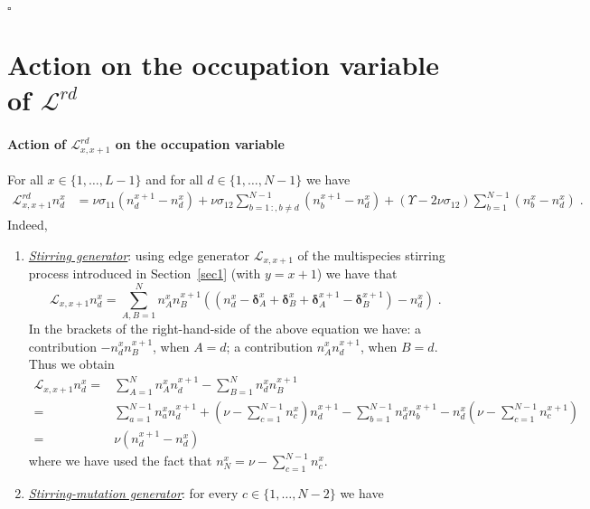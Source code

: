 \documentclass[10pt]{article}
\numberwithin{equation}{section}
\numberwithin{equation}{subsection}
\newcommand{\dt}{\;.}
\begin{document}
{\begin{flushright}
	$\square$
\end{flushright}
\section{Action on the occupation variable of $\mathcal{L}^{rd}$}\label{appendix-RD}
\paragraph{Action of $\mathcal{L}_{x,x+1}^{rd}$ on the occupation variable}
For all $x\in \{1,\ldots,L-1\}$ and for all $d\in \{1,\ldots,N-1\}$ we have
\begin{equation}\label{actionGraphRD}
	\begin{split}
		\mathcal{L}_{x,x+1}^{rd}n_{d}^{x}&=\nu \sigma_{11}(n_{d}^{x+1}-n_{d}^{x})+\nu\sigma_{12}\sum_{b=1\,:	,b\neq d}^{N-1}(n_{b}^{x+1}-n_{d}^{x})+(\Upsilon-2\nu\sigma_{12})\sum_{b=1}^{N-1}(n_{b}^{x}-n_{d}^{x})\dt
	\end{split}
\end{equation}
Indeed, 
\begin{enumerate}
	\item \textit{\underline{Stirring generator}}: {using edge generator $\mathcal{L}_{x,x+1}$ of the multispecies stirring process introduced in Section~\ref{sec1} (with $y=x+1$) we have that} 
\begin{equation}
	\mathcal{L}_{x,x+1}n_{d}^{x}=\sum_{A,B=1}^{N}n_{A}^{x}n_{B}^{x+1}\left((n_{d}^{x}-\bm{\delta}_{A}^{x}+\bm{\delta}_{B}^{x}+\bm{\delta}_{A}^{x+1}-\bm{\delta}_{B}^{x+1})-n_{d}^{x}\right)\dt
\end{equation}
In the brackets of the right-hand-side of the above equation we have: a contribution $-n_{d}^{x}n_{B}^{x+1}$, when $A=d$; a contribution $n_{A}^{x}n_{d}^{x+1}$, when $B=d$. Thus we obtain 
\begin{align*}
	\mathcal{L}_{x,x+1}n_{d}^{x}=&\sum_{A=1}^{N}n_{A}^{x}n_{d}^{x+1}-\sum_{B=1}^{N}n_{d}^{x}n_{B}^{x+1}\\
	=&\sum_{a=1}^{N-1}n_{a}^{x}n_{d}^{x+1}+(\nu-\sum_{c=1}^{N-1}n_{c}^{x})n_{d}^{x+1}-\sum_{b=1}^{N-1}n_{d}^{x}n_{b}^{x+1}-n_{d}^{x}(\nu-\sum_{c=1}^{N-1}n_{c}^{x+1})\\
	=&\nu\left(n_{d}^{x+1}-n_{d}^{x}\right)
\end{align*} 
where we have used the fact that $n_{N}^{x}=\nu-\sum_{c=1}^{N-1}n_{c}^{x}$.
\item \textit{\underline{Stirring-mutation generator}}: for every $c\in \{1,\ldots,N-2\}$ we have 

\end{enumerate}}
\end{document}
